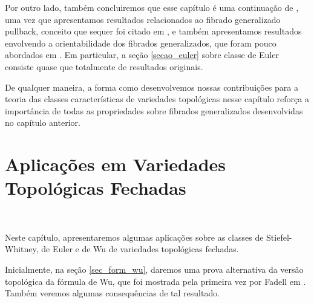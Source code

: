 \documentclass[12pt,oneside]{book} %
\begin{document}
\par Por outro lado, também concluiremos que esse capítulo é uma continuação de \cite{fadell_1}, uma vez que apresentamos resultados relacionados ao fibrado generalizado pullback, conceito que sequer foi citado em \cite{fadell_1}, e também apresentamos resultados envolvendo a orientabilidade dos fibrados generalizados, que foram pouco abordados em \cite{fadell_1}. Em particular, a seção \ref{secao_euler} sobre classe de Euler consiste quase que totalmente de resultados originais.

\par De qualquer maneira, a forma como desenvolvemos nossas contribuições para a teoria das classes características de variedades topológicas nesse capítulo reforça a importância de todas as propriedades sobre fibrados generalizados desenvolvidas no capítulo anterior.










\chapter{Aplicações em Variedades Topológicas Fechadas}\label{cap_aplic}
\thispagestyle{empty}

\

\par Neste capítulo, apresentaremos algumas aplicações sobre as classes de Stiefel-Whitney, de Euler e de Wu de variedades topológicas fechadas.

\par Inicialmente, na seção \ref{sec_form_wu}, daremos uma prova alternativa da versão topológica da fórmula de Wu, que foi mostrada pela primeira vez por Fadell em \cite{fadell_1}. Também veremos algumas consequências de tal resultado.
\end{document}
